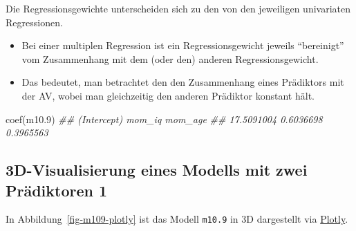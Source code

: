 \documentclass[
  a4paper,
  DIV=11]{scrreprt}
\newenvironment{Shaded}{\begin{snugshade}}{\end{snugshade}}
\newcommand{\DocumentationTok}[1]{\textcolor[rgb]{0.37,0.37,0.37}{\textit{#1}}}
\newcommand{\FloatTok}[1]{\textcolor[rgb]{0.68,0.00,0.00}{#1}}
\newcommand{\FunctionTok}[1]{\textcolor[rgb]{0.28,0.35,0.67}{#1}}
\newcommand{\NormalTok}[1]{\textcolor[rgb]{0.00,0.23,0.31}{#1}}
\providecommand{\tightlist}{%
  \setlength{\itemsep}{0pt}\setlength{\parskip}{0pt}}\usepackage{longtable,booktabs,array}
\theoremstyle{definition}
\theoremstyle{remark}
\begin{document}
\begin{tcolorbox}[enhanced jigsaw, colframe=quarto-callout-important-color-frame, title=\textcolor{quarto-callout-important-color}{\faExclamation}\hspace{0.5em}{Wichtig}, breakable, leftrule=.75mm, coltitle=black, toptitle=1mm, bottomrule=.15mm, bottomtitle=1mm, opacityback=0, arc=.35mm, rightrule=.15mm, left=2mm, colbacktitle=quarto-callout-important-color!10!white, opacitybacktitle=0.6, toprule=.15mm, titlerule=0mm, colback=white]
Die Regressionsgewichte unterscheiden sich zu den von den jeweiligen
univariaten Regressionen.
\end{tcolorbox}

\begin{itemize}
\tightlist
\item
  Bei einer multiplen Regression ist ein Regressionsgewicht jeweils
  ``bereinigt'' vom Zusammenhang mit dem (oder den) anderen
  Regressionsgewicht.
\item
  Das bedeutet, man betrachtet den den Zusammenhang eines Prädiktors mit
  der AV, wobei man gleichzeitig den anderen Prädiktor konstant hält.
\end{itemize}

\begin{Shaded}
\begin{Highlighting}[]
\FunctionTok{coef}\NormalTok{(m10}\FloatTok{.9}\NormalTok{)}
\DocumentationTok{\#\# (Intercept)      mom\_iq     mom\_age }
\DocumentationTok{\#\#  17.5091004   0.6036698   0.3965563}
\end{Highlighting}
\end{Shaded}

\hypertarget{d-visualisierung-eines-modells-mit-zwei-pruxe4diktoren-1}{%
\subsection{3D-Visualisierung eines Modells mit zwei Prädiktoren
1}\label{d-visualisierung-eines-modells-mit-zwei-pruxe4diktoren-1}}

In Abbildung~\ref{fig-m109-plotly} ist das Modell \texttt{m10.9} in 3D
dargestellt via \href{https://plotly.com/r/}{Plotly}.
\end{document}

